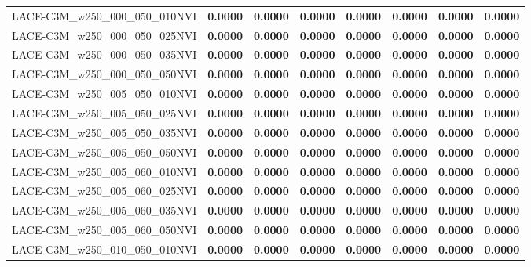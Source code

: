 \begin{table}
\begin{tabular}{lrrrrrrr}
LACE-C3M\_w250\_000\_050\_010NVI & \textbf{0.0000} & \textbf{0.0000} & \textbf{0.0000} & \textbf{0.0000} & \textbf{0.0000} & \textbf{0.0000} & \textbf{0.0000} \\
LACE-C3M\_w250\_000\_050\_025NVI & \textbf{0.0000} & \textbf{0.0000} & \textbf{0.0000} & \textbf{0.0000} & \textbf{0.0000} & \textbf{0.0000} & \textbf{0.0000} \\
LACE-C3M\_w250\_000\_050\_035NVI & \textbf{0.0000} & \textbf{0.0000} & \textbf{0.0000} & \textbf{0.0000} & \textbf{0.0000} & \textbf{0.0000} & \textbf{0.0000} \\
LACE-C3M\_w250\_000\_050\_050NVI & \textbf{0.0000} & \textbf{0.0000} & \textbf{0.0000} & \textbf{0.0000} & \textbf{0.0000} & \textbf{0.0000} & \textbf{0.0000} \\
LACE-C3M\_w250\_005\_050\_010NVI & \textbf{0.0000} & \textbf{0.0000} & \textbf{0.0000} & \textbf{0.0000} & \textbf{0.0000} & \textbf{0.0000} & \textbf{0.0000} \\
LACE-C3M\_w250\_005\_050\_025NVI & \textbf{0.0000} & \textbf{0.0000} & \textbf{0.0000} & \textbf{0.0000} & \textbf{0.0000} & \textbf{0.0000} & \textbf{0.0000} \\
LACE-C3M\_w250\_005\_050\_035NVI & \textbf{0.0000} & \textbf{0.0000} & \textbf{0.0000} & \textbf{0.0000} & \textbf{0.0000} & \textbf{0.0000} & \textbf{0.0000} \\
LACE-C3M\_w250\_005\_050\_050NVI & \textbf{0.0000} & \textbf{0.0000} & \textbf{0.0000} & \textbf{0.0000} & \textbf{0.0000} & \textbf{0.0000} & \textbf{0.0000} \\
LACE-C3M\_w250\_005\_060\_010NVI & \textbf{0.0000} & \textbf{0.0000} & \textbf{0.0000} & \textbf{0.0000} & \textbf{0.0000} & \textbf{0.0000} & \textbf{0.0000} \\
LACE-C3M\_w250\_005\_060\_025NVI & \textbf{0.0000} & \textbf{0.0000} & \textbf{0.0000} & \textbf{0.0000} & \textbf{0.0000} & \textbf{0.0000} & \textbf{0.0000} \\
LACE-C3M\_w250\_005\_060\_035NVI & \textbf{0.0000} & \textbf{0.0000} & \textbf{0.0000} & \textbf{0.0000} & \textbf{0.0000} & \textbf{0.0000} & \textbf{0.0000} \\
LACE-C3M\_w250\_005\_060\_050NVI & \textbf{0.0000} & \textbf{0.0000} & \textbf{0.0000} & \textbf{0.0000} & \textbf{0.0000} & \textbf{0.0000} & \textbf{0.0000} \\
LACE-C3M\_w250\_010\_050\_010NVI & \textbf{0.0000} & \textbf{0.0000} & \textbf{0.0000} & \textbf{0.0000} & \textbf{0.0000} & \textbf{0.0000} & \textbf{0.0000} \\

\end{tabular}
\end{table}
